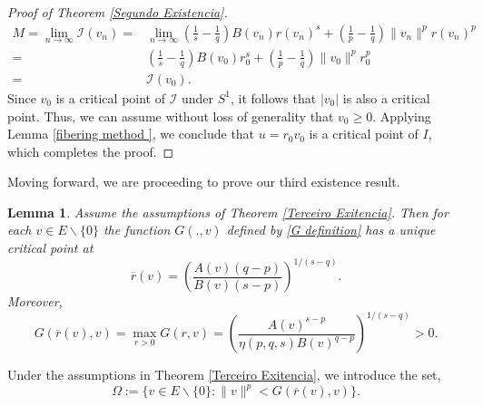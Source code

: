 \documentclass[12pt,reqno]{amsart}
\newtheorem{lemma}[theorem]{Lemma}
\begin{document}
\begin{proof}[Proof of Theorem \ref{Segundo Existencia}]
\begin{align*}
		M=\lim_{n \rightarrow \infty}\mathcal{I}(v_n)
		=& \lim_{n\rightarrow \infty} \left(\frac{1}{s}-\frac{1}{q}\right)B(v_n)r(v_n)^s+\left(\frac{1}{p}-\frac{1}{q}\right)\|v_n\|^pr(v_n)^p\\
		=& \left(\frac{1}{s}-\frac{1}{q}\right)B(v_0)r_0^s+\left(\frac{1}{p}-\frac{1}{q}\right)\|v_0\|^pr_0^p\\
		=& \mathcal{I}(v_0).
	\end{align*}
Since $v_0$ is a critical point of $\mathcal{I}$ under $S^1$, it follows that $|v_0|$ is also a critical point. Thus, we can assume without loss of generality that $v_0\geq 0$. Applying Lemma \ref{fibering method }, we conclude that  $u=r_0 v_0$ is a critical point of $I$, which completes the proof.
\end{proof}

Moving forward, we are proceeding to prove our third existence result.

\begin{lemma}  Assume the assumptions of Theorem \ref{Terceiro Exitencia}. Then for each $v \in E\backslash\{0\}$  the function $G(.,v)$ defined by \eqref{G definition} has a unique critical point at 	
		\begin{equation}\label{critical point r barra}
			\overline{r}(v)=\left(\frac{A(v)(q-p)}{B(v)(s-p)}\right)^{1/(s-q)}.
		\end{equation}
		Moreover, 
		\begin{equation}\label{G de r barra}
			G(\overline{r}(v),v)=	\max_{r>0}G(r,v)=\left(\frac{A(v)^{s-p}}{\eta(p,q,s) B(v)^{q-p}}\right)^{1/(s-q)}>0.
		\end{equation}
		\end{lemma}

Under the assumptions in Theorem \ref{Terceiro Exitencia}, we introduce the set,
$$
		\Omega:=\{v \in E\backslash\{0\}: \|v\|^p<G(\overline{r}(v),v)\}.
  $$
 
\end{document}
